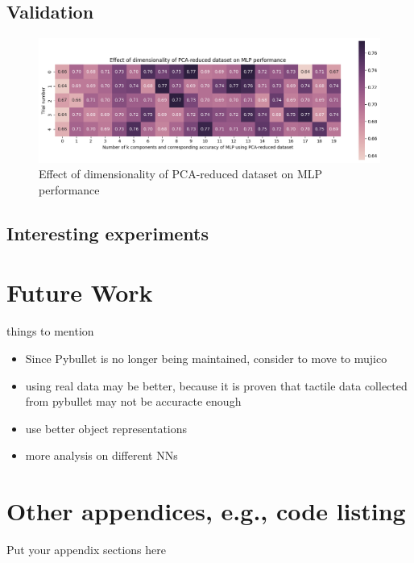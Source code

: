 \documentclass[11pt, a4paper]{report}
\theoremstyle{definition}
\begin{document}
\section{Validation}
\begin{figure}[H]
    \centering
    \includegraphics[scale=0.55]{docs/Project Report/Media/mlp_pca_accuracy_analysis.png}
    \caption{Effect of dimensionality of PCA-reduced dataset on MLP performance}
    \label{fig:my_label}
\end{figure}


\section{Interesting experiments}



\chapter{Future Work}
\label{chap:6}
things to mention
\begin{itemize}
    \item Since Pybullet is no longer being maintained, consider to move to mujico
    \item using real data may be better, because it is proven that tactile data collected from pybullet may not be accuracte enough
    \item use better object representations
    \item more analysis on different NNs
\end{itemize}




\appendix
\printbibliography

\chapter{Other appendices, e.g., code listing}
Put your appendix sections here
\end{document}
